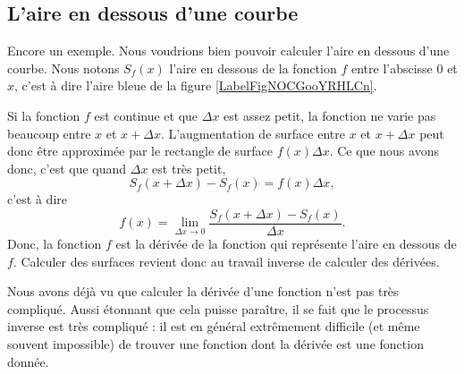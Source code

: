 \newcommand{\CaptionFigLesSubFigures}{Recherche de la tangente par approximations successives.}


\subsection{L'aire en dessous d'une courbe}		\label{SubSecAirePrimInto}

Encore un exemple. Nous voudrions bien pouvoir calculer l'aire en dessous d'une courbe. Nous notons $S_f(x)$ l'aire en dessous de la fonction $f$ entre l'abscisse $0$ et $x$, c'est à dire l'aire bleue de la figure \ref{LabelFigNOCGooYRHLCn}. %
\newcommand{\CaptionFigNOCGooYRHLCn}{L'aire en dessous d'une courbe. Le rectangle rouge d'aire $f(x)\Delta x$ approxime de combien la surface augmente lorsqu'on passe de $x$ à $x+\Delta x$.}


Si la fonction $f$ est continue et que $\Delta x$ est assez petit, la fonction ne varie pas beaucoup entre $x$ et $x+\Delta x$. L'augmentation de surface entre $x$ et $x+\Delta x$ peut donc être approximée par le rectangle de surface $f(x)\Delta x$. Ce que nous avons donc, c'est que quand $\Delta x$ est très petit,
\begin{equation}
	S_f(x+\Delta x)-S_f(x)=f(x)\Delta x,
\end{equation}
c'est à dire
\begin{equation}
	f(x)=\lim_{\Delta x\to 0}\frac{  S_f(x+\Delta x)-S_f(x)}{ \Delta x }.
\end{equation}
Donc, la fonction $f$ est la dérivée de la fonction qui représente l'aire en dessous de $f$. Calculer des surfaces revient donc au travail inverse de calculer des dérivées.

Nous avons déjà vu que calculer la dérivée d'une fonction n'est pas très compliqué. Aussi étonnant que cela puisse paraître, il se fait que le processus inverse est très compliqué : il est en général extrêmement difficile (et même souvent impossible) de trouver une fonction dont la dérivée est une fonction donnée.

